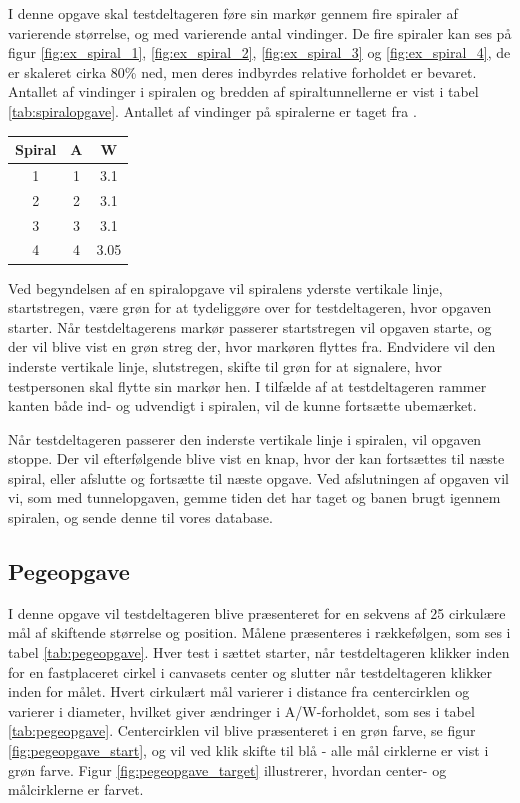 I denne opgave skal testdeltageren føre sin markør gennem fire spiraler af varierende størrelse, og med varierende antal vindinger. De fire spiraler kan ses på figur \ref{fig:ex_spiral_1}, \ref{fig:ex_spiral_2}, \ref{fig:ex_spiral_3} og \ref{fig:ex_spiral_4}, de er skaleret cirka 80\% ned, men deres indbyrdes relative forholdet er bevaret. Antallet af vindinger i spiralen og bredden af spiraltunnellerne er vist i tabel \ref{tab:spiralopgave}. Antallet af vindinger på spiralerne er taget fra \cite{accot1997}.
\begin{center}
	\begin{tabular}{c c c}
		Spiral & A & W \\
		\hline
		1 & 1 & 3.1 \\
		2 & 2 & 3.1\\
		3 & 3 & 3.1\\
		4 & 4 & 3.05\\
	\end{tabular}
	\label{tab:spiralopgave}
\end{center}
Ved begyndelsen af en spiralopgave vil spiralens yderste vertikale linje, startstregen, være grøn for at tydeliggøre over for testdeltageren, hvor opgaven starter. Når testdeltagerens markør passerer startstregen vil opgaven starte, og der vil blive vist en grøn streg der, hvor markøren flyttes fra. Endvidere vil den inderste vertikale linje, slutstregen, skifte til grøn for at signalere, hvor testpersonen skal flytte sin markør hen. I tilfælde af at testdeltageren rammer kanten både ind- og udvendigt i spiralen, vil de kunne fortsætte ubemærket.

Når testdeltageren passerer den inderste vertikale linje i spiralen, vil opgaven stoppe. Der vil efterfølgende blive vist en knap, hvor der kan fortsættes til næste spiral, eller afslutte og fortsætte til næste opgave. Ved afslutningen af opgaven vil vi, som med tunnelopgaven, gemme tiden det har taget og banen brugt igennem spiralen, og sende denne til vores database.

\subsection*{Pegeopgave}
I denne opgave vil testdeltageren blive præsenteret for en sekvens af 25 cirkulære mål af skiftende størrelse og position. Målene præsenteres i rækkefølgen, som ses i tabel \ref{tab:pegeopgave}. Hver test i sættet starter, når testdeltageren klikker inden for en fastplaceret cirkel i canvasets center og slutter når testdeltageren klikker inden for målet. Hvert cirkulært mål varierer i distance fra centercirklen og varierer i diameter, hvilket giver ændringer i A/W-forholdet, som ses i tabel \ref{tab:pegeopgave}. Centercirklen vil blive præsenteret i en grøn farve, se figur \ref{fig:pegeopgave_start}, og vil ved klik skifte til blå - alle mål cirklerne er vist i grøn farve. Figur \ref{fig:pegeopgave_target} illustrerer, hvordan center- og målcirklerne er farvet. 

